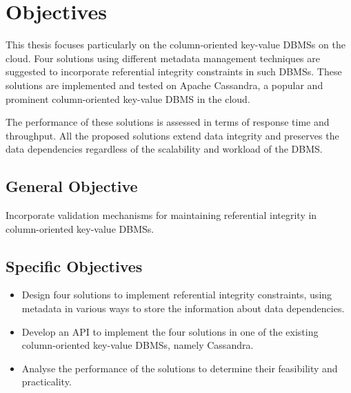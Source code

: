 \section{Objectives} 

This thesis  focuses particularly on the column-oriented
key-value \acp{DBMS}  on the cloud.  Four  solutions 
using different metadata management techniques are suggested to incorporate
referential integrity constraints in such \acp{DBMS}.  These
solutions are implemented and tested on Apache Cassandra, a popular and
prominent column-oriented key-value \ac{DBMS}  in the cloud. 

The performance of these solutions is assessed  in terms of response time and
throughput.  All the proposed solutions extend data integrity
and  preserves the data dependencies regardless of the scalability and workload
of the \ac{DBMS}. 

\subsection{General Objective}
 Incorporate validation mechanisms for maintaining referential integrity in
 column-oriented key-value \acp{DBMS}.

\subsection{Specific Objectives}
\begin{itemize} 
  \item Design four solutions to implement referential integrity constraints,
  using metadata in various ways to store the information about data
  dependencies. 
  \item Develop an \ac{API}  to implement the four solutions in one of the
  existing column-oriented key-value \acp{DBMS}, namely Cassandra.  
  \item Analyse the performance of the solutions to determine their
   feasibility and practicality. 
\end{itemize} 


